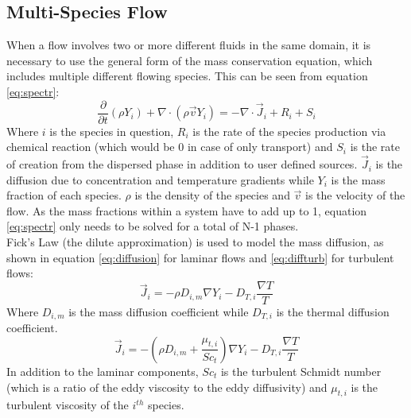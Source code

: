 \documentclass[11pt,a4paper,twoside,oneside]{article}
\begin{document}
\subsection{Multi-Species Flow} \label{sec:mss}
\vspace{.3cm}
When a flow involves two or more different fluids in the same domain, it is necessary to use the general form of the mass conservation equation, which includes multiple different flowing species. This can be seen from equation \ref{eq:spectr}:%
\begin{equation}\label{eq:spectr}
    \frac{\partial}{\partial t}\left(\rho Y_i\right)+\nabla\cdot \left(\rho\vec{v}Y_i\right)=-\nabla\cdot \vec{J}_i+R_i+S_i
\end{equation}
Where $i$ is the species in question, $R_i$ is the rate of the species production via chemical reaction (which would be 0 in case of only transport) and $S_i$ is the rate of creation from the dispersed phase in addition to user defined sources. $\vec{J}_i$ is the diffusion due to concentration and temperature gradients while $Y_i$ is the mass fraction of each species. $\rho$ is the density of the species and $\vec{v}$ is the velocity of the flow. As the mass fractions within a system have to add up to 1, equation \ref{eq:spectr} only needs to be solved for a total of N-1 phases\cite{cfdintro}\cite{versteeg}.\\
Fick's Law\cite{fick} (the dilute approximation) is used to model the mass diffusion, as shown in equation \ref{eq:diffusion} for laminar flows and \ref{eq:diffturb} for turbulent flows:
\begin{equation}
    \label{eq:diffusion}
    \vec{J}_i=-\rho D_{i,m}\nabla Y_i-D_{T,i}\frac{\nabla T}{T}
\end{equation}
Where $D_{i,m}$ is the mass diffusion coefficient while $D_{T,i}$ is the thermal diffusion coefficient.
\begin{equation}
    \label{eq:diffturb}
    \vec{J}_i=-\left(\rho D_{i,m}+\frac{\mu_{t,i}}{Sc_t}\right)\nabla Y_i-D_{T,i}\frac{\nabla T}{T}
\end{equation}
In addition to the laminar components, $Sc_t$ is the turbulent Schmidt number\cite{schmidt} (which is a ratio of the eddy viscosity to the eddy diffusivity) and $\mu_{t,i}$ is the turbulent viscosity of the $i^{th}$ species.\\
\end{document}
